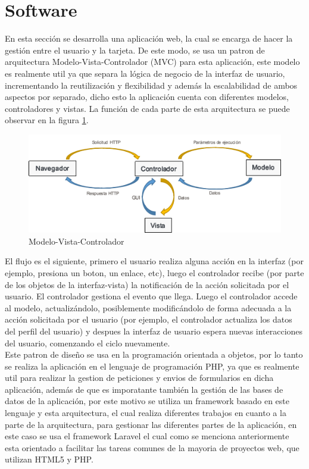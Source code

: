 \section{Software}

En esta sección se desarrolla una aplicación web, la cual se encarga de hacer la gestión entre el usuario y la tarjeta. De este modo, se usa un patron de arquitectura Modelo-Vista-Controlador (MVC) para esta aplicación, este modelo es realmente util ya que separa la lógica de negocio de la interfaz de usuario, incrementando la reutilización y flexibilidad y además la escalabilidad de ambos aspectos por separado, dicho esto la aplicación cuenta con diferentes modelos, controladores y vistas. La función de cada parte de esta arquitectura se puede observar en la figura \ref{fig:mvc}.\\


\begin{figure}
	\centering
	\caption{Modelo-Vista-Controlador}
	\label{fig:mvc}
	\includegraphics[width=0.7\linewidth]{Imagenes/MVC}
\end{figure}


El flujo es el siguiente, primero el usuario realiza alguna acción en la interfaz (por ejemplo, presiona un boton, un enlace, etc), luego el controlador recibe (por parte de los objetos de la interfaz-vista) la notificación de la acción solicitada por el usuario. El controlador gestiona el evento que llega. Luego el controlador accede al modelo, actualizándolo, posiblemente modificándolo de forma adecuada a la acción solicitada por el usuario (por ejemplo, el controlador actualiza los datos del perfil del usuario) y despues la interfaz de usuario espera nuevas interacciones del usuario, comenzando el ciclo nuevamente.\\

Este patron de diseño se usa en la programación orientada a objetos, por lo tanto se realiza la aplicación en el lenguaje de programación PHP, ya que es realmente util para realizar la gestion de peticiones y envios de formularios en dicha aplicación, además de que es imporatante también la gestión de las bases de datos de la aplicación, por este motivo se utiliza un framework basado en este lenguaje y esta arquitectura, el cual realiza diferentes trabajos en cuanto a la parte de la arquitectura, para gestionar las diferentes partes de la aplicación, en este caso se usa el framework Laravel el cual como se menciona anteriormente esta orientado a facilitar las tareas comunes de la mayoria de proyectos web, que utilizan HTML5 y PHP.\\

